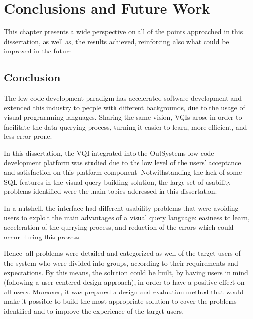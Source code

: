

\chapter{Conclusions and Future Work}
\label{cha:conclusions_and_future_work}

This chapter presents a wide perspective on all of the points approached in this dissertation, as well as, the results achieved, reinforcing also what could be improved in the future.

\section{Conclusion}
\label{sec:conclusion}

The low-code development paradigm has accelerated software development and extended this industry to people with different backgrounds, due to the usage of visual programming languages. Sharing the same vision, \glspl{VQI} arose in order to facilitate the data querying process, turning it easier to learn, more efficient, and less error-prone.

In this dissertation, the \gls{VQI} integrated into the OutSystems low-code development platform was studied due to the low level of the users' acceptance and satisfaction on this platform component. Notwithstanding the lack of some \gls{SQL} features in the visual query building solution, the large set of usability problems identified were the main topics addressed in this dissertation.

In a nutshell, the interface had different usability problems that were avoiding users to exploit the main advantages of a visual query language: easiness to learn, acceleration of the querying process, and reduction of the errors which could occur during this process. 

Hence, all problems were detailed and categorized as well of the target users of the system who were divided into groups, according to their requirements and expectations. By this means, the solution could be built, by having users in mind (following a user-centered design approach), in order to have a positive effect on all users. Moreover, it was prepared a design and evaluation method that would make it possible to build the most appropriate solution to cover the problems identified and to improve the experience of the target users.

